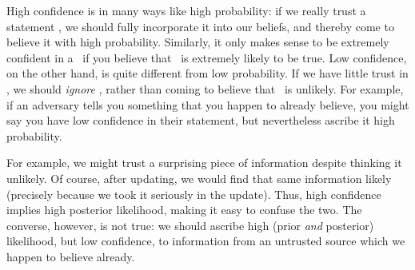 
High confidence is in many ways like high probability: if we really trust a statement \stmt, we should fully incorporate it into our beliefs, and thereby come to believe it with high probability.
Similarly, it only makes sense to be extremely confident in a \stmt\ if you believe that \stmt\ is extremely likely to be true.
Low confidence, on the other hand, is quite different from low probability.
If we have little trust in \stmt, we should \emph{ignore} \stmt, rather than coming to believe that \stmt\ is unlikely.
For example, if an adversary tells you something that you happen to already believe,
you might say you have low confidence in their statement, but nevertheless ascribe it high probability.



For example, we might trust a surprising piece of information despite thinking it unlikely.
Of course, after updating, we would find that same information likely (precisely because we took it seriously in the update).
Thus, high confidence implies high posterior likelihood, making it easy to confuse the two.
The converse, however, is not true:
we should ascribe high (prior \emph{and} posterior) likelihood, but low confidence, to information from an untrusted source which we happen to believe already.


